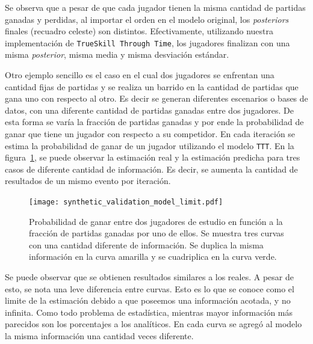 \documentclass[11pt,twoside, spanish]{report} %
\begin{document}
Se observa que a pesar de que cada jugador tienen la misma cantidad de partidas ganadas y perdidas, al importar el orden en el modelo original, los \textit{posteriors} finales (recuadro celeste) son distintos.
Efectivamente, utilizando nuestra implementaci\'on de \texttt{TrueSkill Through Time}, los jugadores finalizan con una misma \textit{posterior}, misma media y misma desviaci\'on est\'andar.

Otro ejemplo sencillo es el caso en el cual dos jugadores se enfrentan una cantidad fijas de partidas y se realiza un barrido en la cantidad de partidas que gana uno con respecto al otro.
Es decir se generan diferentes escenarios o bases de datos, con una diferente cantidad de partidas ganadas entre dos jugadores.
De esta forma se var\'ia la fracci\'on de partidas ganadas y por ende la probabilidad de ganar que tiene un jugador con respecto a su competidor.
En cada iteraci\'on se estima la probabilidad de ganar de un jugador utilizando el modelo \texttt{TTT}.
En la figura~\ref{fig:limite}, se puede observar la estimaci\'on real y la estimaci\'on predicha para tres casos de diferente cantidad de informaci\'on.
Es decir, se aumenta la cantidad de resultados de un mismo evento por iteraci\'on.

 \begin{figure}[H]
	\centering
	\texttt{[image: synthetic\_validation\_model\_limit.pdf]}
	\caption{Probabilidad de ganar entre dos jugadores de estudio en funci\'on a la fracci\'on de partidas ganadas por uno de ellos. Se muestra tres curvas con una cantidad diferente de informaci\'on. Se duplica la misma informaci\'on en la curva amarilla y se cuadriplica en la curva verde.}
	\label{fig:limite}
\end{figure}

Se puede observar que se obtienen resultados similares a los reales.
A pesar de esto, se nota una leve diferencia entre curvas. Esto es lo que se conoce como el limite de la estimaci\'on debido a que poseemos una informaci\'on acotada, y no infinita.
Como todo problema de estad\'istica, mientras mayor informaci\'on m\'as parecidos son los porcentajes a los anal\'iticos.
En cada curva se agreg\'o al modelo la misma informaci\'on una cantidad veces diferente.
\end{document}
